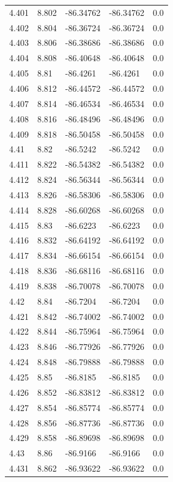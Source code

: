 \begin{tabular}{lllll}
4.401 & 8.802 & -86.34762 & -86.34762 & 0.0 \\
4.402 & 8.804 & -86.36724 & -86.36724 & 0.0 \\
4.403 & 8.806 & -86.38686 & -86.38686 & 0.0 \\
4.404 & 8.808 & -86.40648 & -86.40648 & 0.0 \\
4.405 & 8.81 & -86.4261 & -86.4261 & 0.0 \\
4.406 & 8.812 & -86.44572 & -86.44572 & 0.0 \\
4.407 & 8.814 & -86.46534 & -86.46534 & 0.0 \\
4.408 & 8.816 & -86.48496 & -86.48496 & 0.0 \\
4.409 & 8.818 & -86.50458 & -86.50458 & 0.0 \\
4.41 & 8.82 & -86.5242 & -86.5242 & 0.0 \\
4.411 & 8.822 & -86.54382 & -86.54382 & 0.0 \\
4.412 & 8.824 & -86.56344 & -86.56344 & 0.0 \\
4.413 & 8.826 & -86.58306 & -86.58306 & 0.0 \\
4.414 & 8.828 & -86.60268 & -86.60268 & 0.0 \\
4.415 & 8.83 & -86.6223 & -86.6223 & 0.0 \\
4.416 & 8.832 & -86.64192 & -86.64192 & 0.0 \\
4.417 & 8.834 & -86.66154 & -86.66154 & 0.0 \\
4.418 & 8.836 & -86.68116 & -86.68116 & 0.0 \\
4.419 & 8.838 & -86.70078 & -86.70078 & 0.0 \\
4.42 & 8.84 & -86.7204 & -86.7204 & 0.0 \\
4.421 & 8.842 & -86.74002 & -86.74002 & 0.0 \\
4.422 & 8.844 & -86.75964 & -86.75964 & 0.0 \\
4.423 & 8.846 & -86.77926 & -86.77926 & 0.0 \\
4.424 & 8.848 & -86.79888 & -86.79888 & 0.0 \\
4.425 & 8.85 & -86.8185 & -86.8185 & 0.0 \\
4.426 & 8.852 & -86.83812 & -86.83812 & 0.0 \\
4.427 & 8.854 & -86.85774 & -86.85774 & 0.0 \\
4.428 & 8.856 & -86.87736 & -86.87736 & 0.0 \\
4.429 & 8.858 & -86.89698 & -86.89698 & 0.0 \\
4.43 & 8.86 & -86.9166 & -86.9166 & 0.0 \\
4.431 & 8.862 & -86.93622 & -86.93622 & 0.0 \\

\end{tabular}
